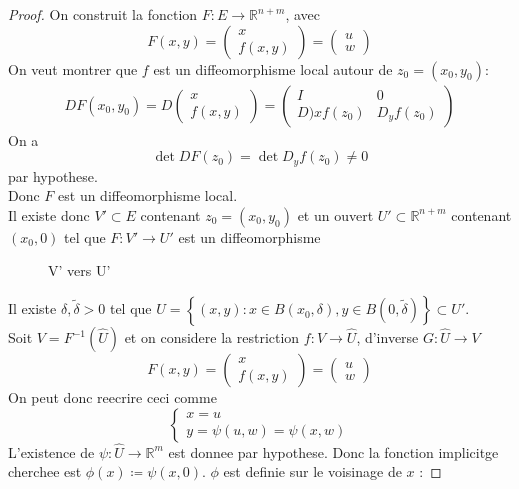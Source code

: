 \documentclass[../main.tex]{subfiles}
\begin{document}
\begin{proof}
On construit la fonction $F: E \to \mathbb{R}^{n+m}$, avec
\[ 
	F( x,y) = \begin{pmatrix}
		x\\f( x,y) 
	\end{pmatrix}
	=
	\begin{pmatrix}
	u\\w
	\end{pmatrix}
\]
On veut montrer que $f$ est un diffeomorphisme local autour de $z_0= ( x_0,y_0) $:
\begin{align*}
	DF( x_0,y_0) = D \begin{pmatrix}
		x\\ f( x,y) 
	\end{pmatrix}
	=
	\begin{pmatrix}
		I & 0 \\ D)xf( z_0)  & D_yf( z_0) 
	\end{pmatrix} 
\end{align*}
On a 
\[ 
	\det DF( z_0) = \det D_yf( z_0) \neq 0
\]
par hypothese.\\
Donc $F$ est un diffeomorphisme local.\\
Il existe donc $V' \subset E$ contenant $z_0= ( x_0,y_0) $ et un ouvert $U'\subset \mathbb{R}^{n+m}$ contenant $( x_0,0) $ tel que $F: V' \to U'$ est un diffeomorphisme
\begin{figure}[H]
    \centering
    \caption{V' vers U'}
    \label{fig:v'-vers-u'}
\end{figure}
Il existe $\delta, \tilde \delta >0$ tel que $\hat{U} = \left\{ ( x,y)  : x \in B( x_0,\delta) , y \in B( 0,\tilde \delta)  \right\} \subset U' $.\\
Soit $V= F^{-1}(  \hat{U}) $ et on considere la restriction $f: V \to \hat{U}$, d'inverse $G: \hat{U} \to V$
\[ 
	F( x,y) = \begin{pmatrix}
		x\\ f( x,y) 
	\end{pmatrix} 
=
\begin{pmatrix}
u\\ w
\end{pmatrix} 
\]
On peut donc reecrire ceci comme
\[ 
\begin{cases}
x=u\\
y= \psi( u,w) = \psi( x,w) 
\end{cases}
\]
L'existence de $\psi: \hat{U}\to \mathbb{R}^m$ est donnee par hypothese.
Donc la fonction implicitge cherchee est $\phi( x) \coloneqq \psi( x,0) $. $\phi$ est definie sur le voisinage de $x$ :

\end{proof}
\end{document}
